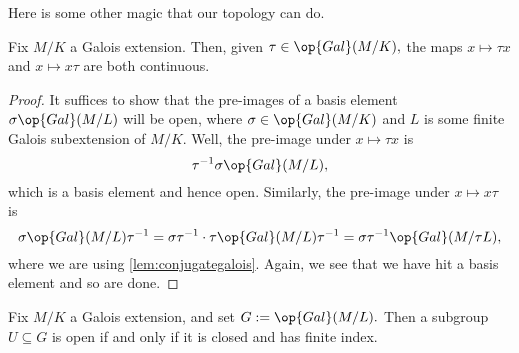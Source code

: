 Here is some other magic that our topology can do.
\begin{proposition}
	Fix $M/K$ a Galois extension. Then, given $\tau\in\op{Gal}(M/K),$ the maps $x\mapsto\tau x$ and $x\mapsto x\tau$ are both continuous.
\end{proposition}
\begin{proof}
	It suffices to show that the pre-images of a basis element $\sigma\op{Gal}(M/L)$ will be open, where $\sigma\in\op{Gal}(M/K)$ and $L$ is some finite Galois subextension of $M/K.$ Well, the pre-image under $x\mapsto\tau x$ is
	\[\tau^{-1}\sigma\op{Gal}(M/L),\]
	which is a basis element and hence open. Similarly, the pre-image under $x\mapsto x\tau$ is
	\[\sigma\op{Gal}(M/L)\tau^{-1}=\sigma\tau^{-1}\cdot\tau\op{Gal}(M/L)\tau^{-1}=\sigma\tau^{-1}\op{Gal}(M/\tau L),\]
	where we are using \autoref{lem:conjugategalois}. Again, we see that we have hit a basis element and so are done.
\end{proof}
\begin{proposition}
	Fix $M/K$ a Galois extension, and set $G:=\op{Gal}(M/L).$ Then a subgroup $U\subseteq G$ is open if and only if it is closed and has finite index.
\end{proposition}
